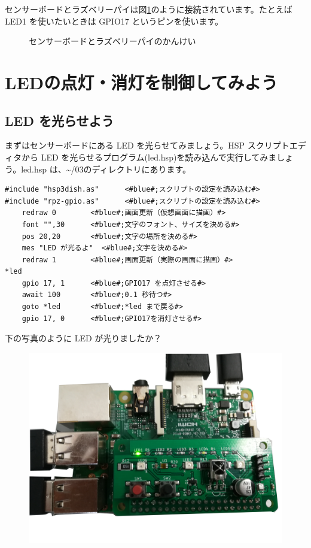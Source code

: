 センサーボードとラズベリーパイは図\ref{sensors}のように接続されています。たとえば LED1 を使いたいときは GPIO17 というピンを使います。

\begin{figure}[H]
    \centering
    
    \caption{センサーボードとラズベリーパイのかんけい}
    \label{sensors}
\end{figure}

\section{LEDの点灯・消灯を制御してみよう}
\subsection{LED を光らせよう}

まずはセンサーボードにある LED を光らせてみましょう。HSP スクリプトエディタから LED を光らせるプログラム(led.hsp)を読み込んで実行してみましょう。led.hsp は、\textasciitilde /03のディレクトリにあります。\\

\begin{lstlisting}[caption=led.hsp,label=led.hsp]
#include "hsp3dish.as"		<#blue#;スクリプトの設定を読み込む#>
#include "rpz-gpio.as"		<#blue#;スクリプトの設定を読み込む#>
	redraw 0		<#blue#;画面更新（仮想画面に描画）#>
	font "",30		<#blue#;文字のフォント、サイズを決める#>
	pos 20,20		<#blue#;文字の場所を決める#>
	mes "LED が光るよ"	<#blue#;文字を決める#>
	redraw 1		<#blue#;画面更新（実際の画面に描画）#>
*led
	gpio 17, 1		<#blue#;GPIO17 を点灯させる#>
	await 100		<#blue#;0.1 秒待つ#>
	goto *led		<#blue#;*led まで戻る#>
	gpio 17, 0		<#blue#;GPIO17を消灯させる#>
\end{lstlisting}

下の写真のように LED が光りましたか？\\

\begin{figure}[H]
    \centering
    \includegraphics[width=\linewidth]{images/chap03/text03-img032.jpg}
\end{figure}

